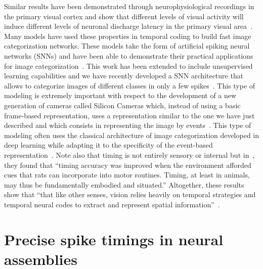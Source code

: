 \documentclass[brainsci, %
               review,submit,pdftex,moreauthors]{Definitions/mdpi}
\begin{document}
Similar results have been demonstrated through neurophysiological recordings in the primary visual cortex and show that different levels of visual activity will induce different levels of neuronal discharge latency in the primary visual area~\citep{celebrini_dynamics_1993}. Many models have used these properties in temporal coding to build fast image categorization networks. These models take the form of artificial spiking neural networks (SNNs) and have been able to demonstrate their practical applications for image categorization~\citep{thorpe_speed_1996}. This work has been extended to include unsupervised learning capabilities and we have recently developed a SNN architecture that allows to categorize images of different classes in only a few spikes~\citep{grimaldi_homeostatic_2021,grimaldi_robust_2022}. This type of modeling is extremely important with respect to the development of a new generation of cameras called Silicon Cameras which, instead of using a basic frame-based representation, uses a representation similar to the one we have just described and which consists in representing the image by events~\citep{rasetto_challenges_2022}. This type of modeling often uses the classical architecture of image categorization developed in deep learning while adapting it to the specificity of the event-based representation~\citep{goltz_fast_2021}. Note also that timing is not entirely sensory or internal but in~\citep{safaie_turning_2020}, they found that ``timing accuracy was improved when the environment afforded cues that rats can incorporate into motor routines. Timing, at least in animals, may thus be fundamentally embodied and situated.'' Altogether, these results show that ``that like other senses, vision relies heavily on temporal strategies and temporal neural codes to extract and represent spatial information''~\citep{rucci_temporal_2018}.


\section{Precise spike timings in neural assemblies}
\end{document}
